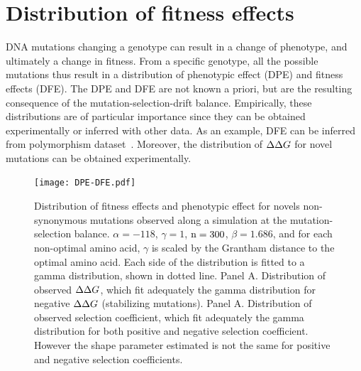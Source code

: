 \section{Distribution of fitness effects}
DNA mutations changing a genotype can result in a change of phenotype, and ultimately a change in fitness.
From a specific genotype, all the possible mutations thus result in a distribution of phenotypic effect (DPE) and fitness effects (\acrshort{DFE}).
The DPE and \acrshort{DFE} are not known a priori, but are the resulting consequence of the mutation-selection-drift balance.
Empirically, these distributions are of particular importance since they can be obtained experimentally or inferred with other data.
As an example, \acrshort{DFE} can be inferred from polymorphism dataset~\citep{Eyre-walker2007, Galtier2016}.
Moreover, the distribution of $\Delta \Delta G$ for novel mutations can be obtained experimentally.

\begin{figure}[H]
	\centering
	\texttt{[image: DPE-DFE.pdf]}
	\caption[Distribution of fitness effects and phenotypic effect]{
	Distribution of fitness effects and phenotypic effect for novels non-synonymous mutations observed along a simulation at the mutation-selection balance.
	$\alpha=-118$, $\gamma=1$, $\text{n}=300$, $\beta=1.686$, and for each non-optimal amino acid, $\gamma$ is scaled by the Grantham distance to the optimal amino acid.
	Each side of the distribution is fitted to a gamma distribution, shown in dotted line.
	Panel A. Distribution of observed $\Delta \Delta G$, which fit adequately the gamma distribution for negative $\Delta \Delta G$ (stabilizing mutations).
	Panel A. Distribution of observed selection coefficient, which fit adequately the gamma distribution for both positive and negative selection coefficient. However the shape parameter estimated is not the same for positive and negative selection coefficients.
	}
\end{figure}